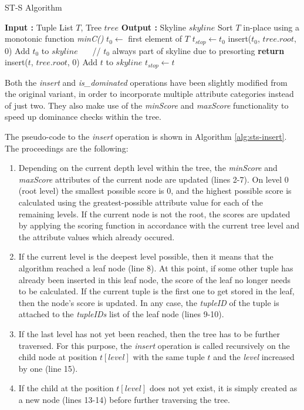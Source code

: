 \begin{algorithm}[h]
	\caption{ST-S Algorithm} \label{alg:sts}
	\begin{algorithmic}[1] 
		\State \textbf{Input :} Tuple List $T$, Tree $tree$
		\State \textbf{Output :} Skyline $skyline$
		\State Sort $ T $ in-place using a monotonic function \textit{minC()}
		\State $t_{0} \gets $ first element of $T$
		\State $t_{stop} \gets t_{0}$
		\State insert($t_{0}$, $tree.root$, 0)
		\State Add $t_{0}$ to $skyline$ $~~~~~$ {\footnotesize // $t_{0}$ always part of skyline due to presorting}
				\textbf{return}
			\EndIf
				\State insert($t$, $tree.root$, 0)
				\State Add $t$ to $skyline$
					\State $t_{stop} \gets t$ 
				\EndIf
			\EndIf
		\EndFor	
	\end{algorithmic}
\end{algorithm}

\noindent Both the \textit{insert} and \textit{is\_dominated} operations have been slightly modified from the original variant, in order to incorporate multiple attribute categories instead of just two. They also make use of the \textit{minScore} and \textit{maxScore} functionality to speed up dominance checks within the tree. 

The pseudo-code to the \textit{insert} operation is shown in Algorithm \ref{alg:sts-insert}. The proceedings are the following: 
\begin{enumerate}
	\item Depending on the current depth level within the tree, the \textit{minScore} and \textit{maxScore} attributes of the current node are updated (lines 2-7). On level 0 (root level) the smallest possible score is 0, and the highest possible score is calculated using the greatest-possible attribute value for each of the remaining levels. If the current node is not the root, the scores are updated by applying the scoring function in accordance with the current tree level and the attribute values which already occured. 
	\item If the current level is the deepest level possible, then it means that the algorithm reached a leaf node (line 8). At this point, if some other tuple has already been inserted in this leaf node, the score of the leaf no longer needs to be calculated. If the current tuple is the first one to get stored in the leaf, then the node's score is updated. In any case, the \textit{tupleID} of the tuple is attached to the \textit{tupleIDs} list of the leaf node (lines 9-10). 
	\item If the last level has not yet been reached, then the tree has to be further traversed. For this purpose, the \textit{insert} operation is called recursively on the child node at position $t[level]$ with the same tuple $t$ and the \textit{level} increased by one (line 15). 
	\item If the child at the position $t[level]$ does not yet exist, it is simply created as a new node (lines 13-14) before further traversing the tree. 
\end{enumerate}

